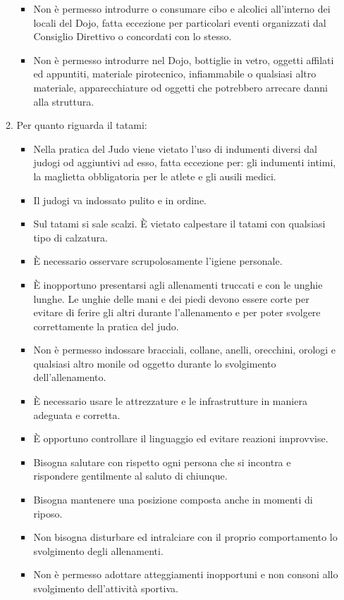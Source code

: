 \documentclass{djtsasddoc}
\begin{document}
\begin{enumerate}
\begin{enumerate}
\begin{itemize}
				\item Non è permesso introdurre o consumare cibo e alcolici all'interno dei locali del Dojo, fatta eccezione per particolari eventi organizzati dal Consiglio Direttivo o concordati con lo stesso. 
				\item Non è permesso introdurre nel Dojo, bottiglie in vetro, oggetti affilati ed appuntiti, materiale pirotecnico, infiammabile o qualsiasi altro materiale, apparecchiature od oggetti che potrebbero arrecare danni alla struttura.
			\end{itemize}
			\item Per quanto riguarda il tatami:
			\begin{itemize}
				\item Nella pratica del Judo viene vietato l'uso di indumenti diversi dal judogi od aggiuntivi ad esso, fatta eccezione per: gli indumenti intimi,  la maglietta obbligatoria per le atlete e  gli ausili medici. 
				\item Il judogi va indossato pulito e in ordine.
				\item Sul tatami si sale scalzi. È vietato calpestare il tatami con qualsiasi tipo di calzatura.
				\item È necessario osservare scrupolosamente l'igiene personale. 
				\item È inopportuno presentarsi agli allenamenti truccati e con le unghie lunghe. Le unghie delle mani e dei piedi devono essere corte per evitare di ferire gli altri durante l'allenamento e per poter svolgere correttamente la pratica del judo. 
				\item Non è permesso indossare bracciali, collane, anelli, orecchini, orologi e qualsiasi altro 	monile od oggetto durante lo svolgimento dell'allenamento. 
				\item È necessario usare le attrezzature e le infrastrutture in maniera adeguata e corretta. 
				\item È opportuno controllare il linguaggio ed evitare reazioni improvvise.
				\item Bisogna salutare con rispetto ogni persona che si incontra e rispondere gentilmente al saluto di chiunque.
				\item Bisogna mantenere una posizione composta  anche in momenti di riposo.
				\item Non bisogna disturbare ed intralciare con il proprio comportamento lo svolgimento degli allenamenti.
				\item Non è permesso adottare atteggiamenti inopportuni e non consoni allo svolgimento 	dell'attività sportiva.

\end{itemize}
\end{enumerate}
\end{enumerate}
\end{document}

